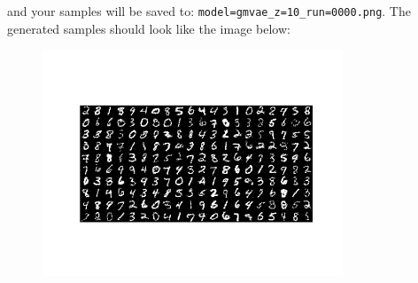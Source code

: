 \begin{enumerate}[label=(\alph*)]
    and your samples will be saved to: \texttt{model=gmvae\_z=10\_run=0000.png}. The generated samples should look like the image below:

    \begin{figure}[h]
        \centering
        \includegraphics[width=0.8\textwidth]{./figures/gmvae_gen}
    \end{figure}

\end{enumerate}